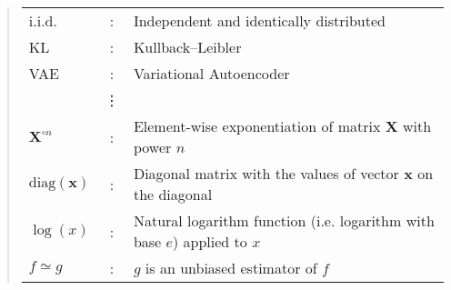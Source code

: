 \documentclass[ oneside,%
                    author={George Herbert},
                    degree={MSci},
                     title={Video Diffusion Models for Climate Simulations},
                  subtitle={}]{dissertation}
\begin{document}
\begin{quote}
\noindent
\begin{tabular}{lcl}
      i.i.d. &: & Independent and identically distributed\\
      KL &: & Kullback--Leibler\\
      VAE &: & Variational Autoencoder\\
      &\vdots&\\
      $\mathbf{X}^{\circ n}$ &: & Element-wise exponentiation of matrix $\mathbf{X}$ with power $n$\\
      $\mathrm{diag}(\mathbf{x})$ &: & Diagonal matrix with the values of vector $\mathbf{x}$ on the diagonal\\
      $\log(x)$ &: & Natural logarithm function (i.e. logarithm with base $e$) applied to $x$\\
      $f\simeq g$ &: & $g$ is an unbiased estimator of $f$\\
     
\end{tabular}
\end{quote}



%
\end{document}
